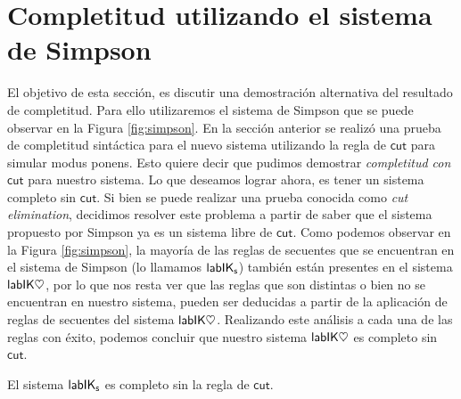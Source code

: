 \section{Completitud utilizando el sistema de Simpson}
El objetivo de esta sección, es discutir una demostración alternativa del resultado de completitud. Para ello utilizaremos el sistema de Simpson \cite{simpson1994} que se puede observar en la Figura \ref{fig:simpson}. En la sección anterior se realizó una prueba de completitud sintáctica para el nuevo sistema utilizando la regla de $\mathsf{cut}$ para simular modus ponens. Esto quiere decir que pudimos demostrar \emph{completitud con $\mathsf{cut}$} para nuestro sistema. Lo que deseamos lograr ahora, es tener un sistema completo sin $\mathsf{cut}$. Si bien se puede realizar una prueba conocida como \emph{cut elimination}, decidimos resolver este problema a partir de saber que el sistema propuesto por Simpson ya es un sistema libre de $\mathsf{cut}$. Como podemos observar en la Figura \ref{fig:simpson}, la mayoría de las reglas de secuentes que se encuentran en el sistema de Simpson (lo llamamos $\mathsf{labIK_{s}}$) también están presentes en el sistema $\mathsf{labIK\heartsuit}$, por lo que nos resta ver que las reglas que son distintas o bien no se encuentran en nuestro sistema, pueden ser deducidas a partir de la aplicación de reglas de secuentes del sistema $\mathsf{labIK\heartsuit}$. Realizando este análisis a cada una de las reglas con éxito, podemos concluir que nuestro sistema $\mathsf{labIK\heartsuit}$ es completo sin $\mathsf{cut}$.

\begin{teo}
	El sistema $\mathsf{labIK_{s}}$ es completo sin la regla de $\mathsf{cut}$.
\end{teo}


